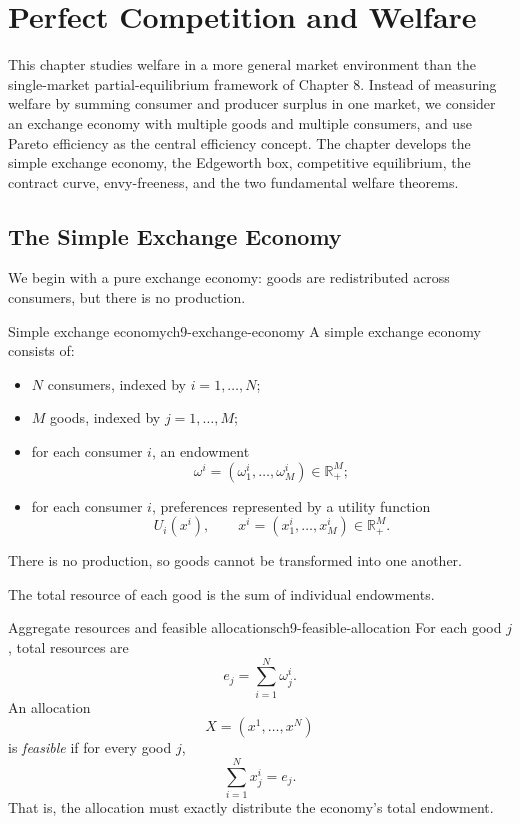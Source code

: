 
\section{Perfect Competition and Welfare}

This chapter studies welfare in a more general market environment than the single-market partial-equilibrium framework of Chapter 8. Instead of measuring welfare by summing consumer and producer surplus in one market, we consider an exchange economy with multiple goods and multiple consumers, and use Pareto efficiency as the central efficiency concept. The chapter develops the simple exchange economy, the Edgeworth box, competitive equilibrium, the contract curve, envy-freeness, and the two fundamental welfare theorems.

\subsection{The Simple Exchange Economy}

We begin with a pure exchange economy: goods are redistributed across consumers, but there is no production.

\begin{definition}{Simple exchange economy}{ch9-exchange-economy}
A simple exchange economy consists of:
\begin{itemize}
    \item $N$ consumers, indexed by $i=1,\dots,N$;
    \item $M$ goods, indexed by $j=1,\dots,M$;
    \item for each consumer $i$, an endowment
    \[
    \omega^i = (\omega_1^i,\dots,\omega_M^i) \in \mathbb{R}_+^M;
    \]
    \item for each consumer $i$, preferences represented by a utility function
    \[
    U_i(x^i),
    \qquad
    x^i=(x_1^i,\dots,x_M^i)\in \mathbb{R}_+^M.
    \]
\end{itemize}
There is no production, so goods cannot be transformed into one another.
\end{definition}

The total resource of each good is the sum of individual endowments.

\begin{definition}{Aggregate resources and feasible allocations}{ch9-feasible-allocation}
For each good $j$, total resources are
\[
e_j = \sum_{i=1}^N \omega_j^i.
\]
An allocation
\[
X=(x^1,\dots,x^N)
\]
is \emph{feasible} if for every good $j$,
\[
\sum_{i=1}^N x_j^i = e_j.
\]
That is, the allocation must exactly distribute the economy's total endowment.
\end{definition}

